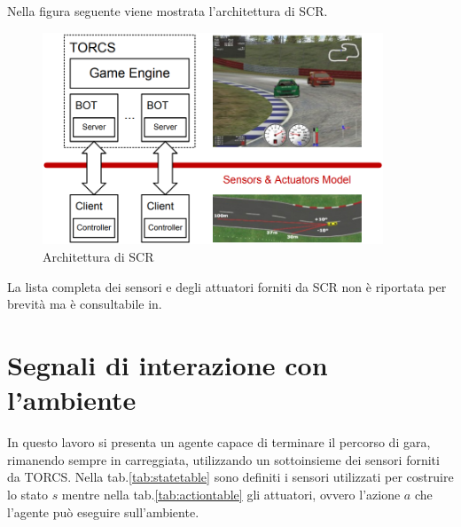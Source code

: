 Nella figura seguente viene mostrata l'architettura di SCR.

\begin{figure}[hb]
    \centering
    \includegraphics[width = 4in]{Figures/Chapter3/scr_model.png}
    \caption{Architettura di SCR}
    \label{fig:scrmodel}
\end{figure}

La lista completa dei sensori e degli attuatori forniti da SCR non è riportata per brevità ma è consultabile in\cite{scrloiaconoPaper}.

\clearpage

\section{Segnali di interazione con l'ambiente}

In questo lavoro si presenta un agente capace di terminare il percorso di gara, rimanendo sempre in carreggiata, utilizzando un sottoinsieme dei sensori forniti da TORCS. Nella tab.\ref{tab:statetable} sono definiti i sensori utilizzati per costruire lo stato $s$ mentre nella tab.\ref{tab:actiontable} gli attuatori, ovvero l'azione $a$ che l'agente può eseguire sull'ambiente.

